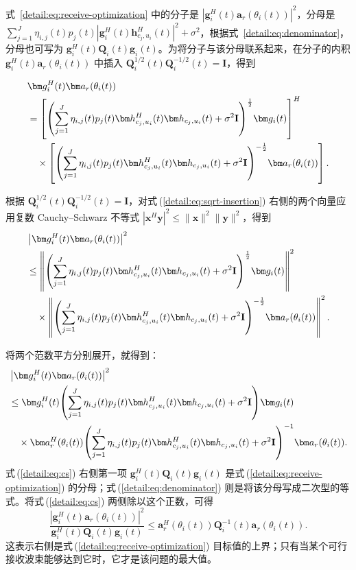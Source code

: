 式~\eqref{detail:eq:receive-optimization} 中的分子是 $|\bm g_i^H(t)\bm a_r(\theta_i(t))|^2$，分母是 $\sum_{j=1}^{J}\eta_{i,j}(t)p_j(t)|\bm g_i^H(t)\bm h_{c_j,u_i}^H(t)|^2+\sigma^2$，根据式~\eqref{detail:eq:denominator}，分母也可写为 $\bm g_i^H(t)\mathbf Q_i(t)\bm g_i(t)$。为将分子与该分母联系起来，在分子的内积 $\bm g_i^H(t)\bm a_r(\theta_i(t))$ 中插入 $\mathbf Q_i^{1/2}(t)\mathbf Q_i^{-1/2}(t)=\mathbf I$，得到
\begin{samepage}
\begin{align}\label{detail:eq:sqrt-insertion}
&\bm g_i^H(t)\bm a_r(\theta_i(t))\notag\\
&=\left[\left(\sum_{j=1}^J\eta_{i,j}(t)p_j(t)
\bm h_{c_j,u_i}^{H}(t)\bm h_{c_j,u_i}(t)+\sigma^2\mathbf I\right)^{\frac12}\!\bm g_i(t)\right]^H\notag\\
&\quad\times\left[\left(\sum_{j=1}^J\eta_{i,j}(t)p_j(t)
\bm h_{c_j,u_i}^{H}(t)\bm h_{c_j,u_i}(t)+\sigma^2\mathbf I\right)^{-\frac12}\!\bm a_r(\theta_i(t))\right].
\end{align}
\end{samepage}
\begin{samepage}
根据 $\mathbf Q_i^{1/2}(t)\mathbf Q_i^{-1/2}(t)=\mathbf I$，对式\,(\ref{detail:eq:sqrt-insertion}) 右侧的两个向量应用复数 Cauchy--Schwarz 不等式 $|\bm x^H\bm y|^2\le\|\bm x\|^2\|\bm y\|^2$，得到
\begin{align}\label{detail:eq:cs-norms}
&\left|\bm g_i^H(t)\bm a_r(\theta_i(t))\right|^2\notag\\
&\le\left\|\left(\sum_{j=1}^J\eta_{i,j}(t)p_j(t)
\bm h_{c_j,u_i}^{H}(t)\bm h_{c_j,u_i}(t)+\sigma^2\mathbf I\right)^{\frac12}\!\bm g_i(t)\right\|^2\notag\\
&\quad\times\left\|\left(\sum_{j=1}^J\eta_{i,j}(t)p_j(t)
\bm h_{c_j,u_i}^{H}(t)\bm h_{c_j,u_i}(t)+\sigma^2\mathbf I\right)^{-\frac12}\!\bm a_r(\theta_i(t))\right\|^2.
\end{align}
\end{samepage}
将两个范数平方分别展开，就得到：
\begin{align}
&\left|\bm g_i^H(t)\bm a_r(\theta_i(t))\right|^2\notag\\
&\le\bm g_i^H(t)\!\left(\sum_{j=1}^J\eta_{i,j}(t)p_j(t)
\bm h_{c_j,u_i}^{H}(t)\bm h_{c_j,u_i}(t)+\sigma^2\mathbf I\right)\!\bm g_i(t)\notag\\
&\quad\times\bm a_r^H(\theta_i(t))\!\left(\sum_{j=1}^J\eta_{i,j}(t)p_j(t)
\bm h_{c_j,u_i}^{H}(t)\bm h_{c_j,u_i}(t)+\sigma^2\mathbf I\right)^{-1}\!\bm a_r(\theta_i(t)).\label{detail:eq:cs}
\end{align}
式\,(\ref{detail:eq:cs}) 右侧第一项 $\bm g_i^H(t)\mathbf Q_i(t)\bm g_i(t)$ 是式\,(\ref{detail:eq:receive-optimization}) 的分母；式\,(\ref{detail:eq:denominator}) 则是将该分母写成二次型的等式。将式\,(\ref{detail:eq:cs}) 两侧除以这个正数，可得
\begin{equation}\label{detail:eq:upper-bound}
\frac{|\bm g_i^H(t)\bm a_r(\theta_i(t))|^2}{\bm g_i^H(t)\mathbf Q_i(t)\bm g_i(t)}
\le\bm a_r^H(\theta_i(t))\mathbf Q_i^{-1}(t)\bm a_r(\theta_i(t)).
\end{equation}
这表示右侧是式\,(\ref{detail:eq:receive-optimization}) 目标值的上界；只有当某个可行接收波束能够达到它时，它才是该问题的最大值。

